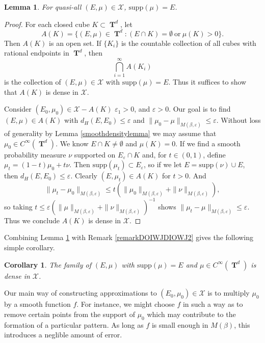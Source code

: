 \documentclass[12pt,reqno]{article}
\numberwithin{equation}{section}
\DeclareMathOperator{\TT}{\mathbf{T}}
\newtheorem{lemma}{Lemma}
\newtheorem{corollary}{Corollary}
\begin{document}
\begin{lemma} \label{lemmaOIJAWDIOJW23232}
    For quasi-all $(E,\mu) \in \mathcal{X}$, $\text{supp}(\mu) = E$.
\end{lemma}
\begin{proof}
    For each closed cube $K \subset \TT^d$, let
    \[ A(K) = \{ (E,\mu) \in \TT^d: (E \cap K) = \emptyset\ \text{or}\ \mu(K) > 0 \}. \]
    Then $A(K)$ is an open set. If $\{ K_i \}$ is the countable collection of all cubes with rational endpoints in $\TT^d$, then
    \[ \bigcap_{i = 1}^\infty A(K_i) \]
    is the collection of $(E,\mu) \in \mathcal{X}$ with $\text{supp}(\mu) = E$. Thus it suffices to show that $A(K)$ is dense in $\mathcal{X}$.

    Consider $(E_0,\mu_0) \in \mathcal{X} - A(K)$ $\varepsilon_1 > 0$, and $\varepsilon > 0$. Our goal is to find $(E,\mu) \in A(K)$ with $d_H(E,E_0) \leq \varepsilon$ and $\| \mu_0 - \mu \|_{M(\beta,\varepsilon)} \leq \varepsilon$. Without loss of generality by Lemma \ref{smoothdensitylemma} we may assume that $\mu_0 \in C^\infty(\TT^d)$. We know $E \cap K \neq \emptyset$ and $\mu(K) = 0$. If we find a smooth probability measure $\nu$ supported on $E_\varepsilon \cap K$ and, for $t \in (0,1)$, define $\mu_t = (1 - t) \mu_0 + t \nu$. Then $\text{supp}(\mu_t) \subset E_\varepsilon$, so if we let $E = \text{supp}(\nu) \cup E$, then $d_H(E,E_0) \leq \varepsilon$. Clearly $(E,\mu_t) \in A(K)$ for $t > 0$. And
    \[ \| \mu_t - \mu_0 \|_{M(\beta,\varepsilon)} \leq t \left( \| \mu_0 \|_{M(\beta,\varepsilon)} + \| \nu \|_{M(\beta,\varepsilon)} \right), \]
    so taking $t \leq \varepsilon (\| \mu \|_{M(\beta,\varepsilon)} + \| \nu \|_{M(\beta,\varepsilon)})^{-1}$ shows $\| \mu_t - \mu \|_{M(\beta,\varepsilon)} \leq \varepsilon$. Thus we conclude $A(K)$ is dense in $\mathcal{X}$.
\end{proof}

Combining Lemma \ref{lemmaOIJAWDIOJW23232} with Remark \ref{remarkDOIWJDIOWJ2} gives the following simple corollary.

\begin{corollary} \label{corollaryOIDJOWIJD2212}
    The family of $(E,\mu)$ with $\text{supp}(\mu) = E$ and $\mu \in C^\infty(\TT^d)$ is dense in $\mathcal{X}$.
\end{corollary}

Our main way of constructing approximations to $(E_0,\mu_0) \in \mathcal{X}$ is to multiply $\mu_0$ by a smooth function $f$. For instance, we might choose $f$ in such a way as to remove certain points from the support of $\mu_0$ which may contribute to the formation of a particular pattern. As long as $f$ is small enough in $M(\beta)$, this introduces a neglible amount of error.
\end{document}
